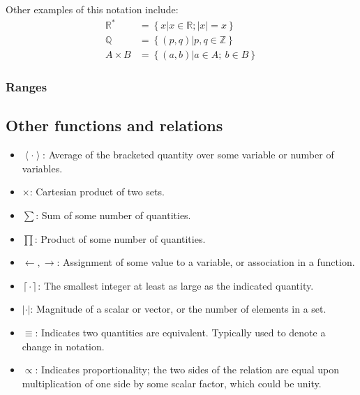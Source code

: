 \documentclass{article}
\newcommand{\braces}[1]{\ensuremath{\left\lbrace #1 \right\rbrace}}
\newcommand{\angles}[1]{\ensuremath{\left\langle #1 \right\rangle}}
\newcommand{\setbuilder}[2]{\ensuremath{\braces{#1 \left| #2 \right.}}}
\newcommand{\integers}{\ensuremath{\mathbb{Z}}}
\newcommand{\reals}{\ensuremath{\mathbb{R}}}
\newcommand{\rationals}{\ensuremath{\mathbb{Q}}}
\newcommand{\abs}[1]{\ensuremath{\left|#1\right|}}
\newcommand{\ceil}[1]{\ensuremath{\left\lceil #1\right\rceil}}
\begin{document}
\begin{appendix}
Other examples of this notation include:
\begin{align}
\reals^{*} &= \setbuilder{x}
                        {x\in\reals; \abs{x}=x} \\
\rationals &= \setbuilder{(p,q)}
                        {p,q\in\integers} \\
A\times B &= \setbuilder{(a,b)}
                       {a\in A;~b\in B}                       
\end{align}

\subsubsection{Ranges}

\subsection{Other functions and relations}
\begin{itemize}
\item \angles{\cdot}: Average of the bracketed quantity over some variable or number of variables.
\item $\times$: Cartesian product of two sets.
\item $\sum$: Sum of some number of quantities.
\item $\prod$: Product of some number of quantities.
\item $\leftarrow,\rightarrow$: Assignment of some value to a variable, or association in a function.
\item $\ceil{\cdot}$: The smallest integer at least as large as the indicated quantity.
\item $\abs{\cdot}$: Magnitude of a scalar or vector, or the number of elements in a set.
\item $\equiv$: Indicates two quantities are equivalent. Typically used to denote a change in notation.
\item $\propto$: Indicates proportionality; the two sides of the relation are equal upon multiplication of one side by some scalar factor, which could be unity.
\end{itemize}

\end{appendix}
\end{document}

